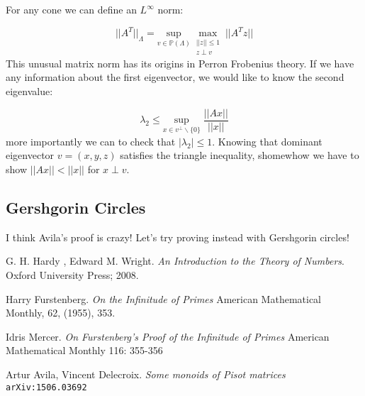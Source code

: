 \documentclass[12pt]{article}
\begin{document}
{\noindent For any cone we can define an $L^\infty$ norm:

$$ || A^T||_\Lambda = \underset{v \in \mathbb{P}(\Lambda) }{\mathrm{sup}} \;
\underset{\substack {  ||z||\leq 1  \\ z \perp v }}{\mathrm{max}} \;||A^T z||$$
This unusual matrix norm has its origins in Perron Frobenius theory.  If we have any information about the first eigenvector, we would like to know the second eigenvalue:

$$ \lambda_2 \leq \underset{x \in v^\perp \backslash \{0\} }{\mathrm{sup}} \; \frac{||A x||}{||x||} $$
more importantly we can to check that $|\lambda_2| \leq 1$. Knowing that dominant eigenvector $v = (x,y,z)$ satisfies the triangle inequality, shomewhow we have to show $||A x|| < ||x|| $ for $x \perp v$.

\subsection{Gershgorin Circles}

I think Avila's proof is crazy!  Let's try proving instead with Gershgorin circles!


\begin{thebibliography}{9}
G. H. Hardy , Edward M. Wright.
\textit{An Introduction to the Theory of Numbers}. 
Oxford University Press; 2008.
 
Harry Furstenberg.  \textit{On the Infinitude of Primes} American Mathematical Monthly, 62, (1955), 353.

Idris Mercer.  \textit{On Furstenberg's Proof of the
Infinitude of Primes} American Mathematical Monthly 116: 355-356

Artur Avila, Vincent Delecroix. \textit{Some monoids of Pisot matrices}
\texttt{arXiv:1506.03692}
 
 

\end{thebibliography}
}
\end{document}
